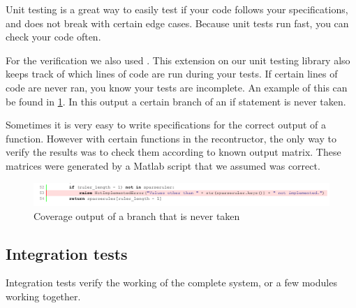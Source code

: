\documentclass[a4paper, openany, oneside]{memoir}
\begin{document}
Unit testing is a great way to easily test if your code follows your specifications, and does not break with certain edge cases. Because unit tests run fast, you can check your code often.

For the verification we also used . This extension on our unit testing library also keeps track of which lines of code are run during your tests. If certain lines of code are never ran, you know your tests are incomplete. An example of this can be found in \cref{fig:coverage_branch}. In this output a certain branch of an if statement is never taken.

Sometimes it is very easy to write specifications for the correct output of a function. However with certain functions in the recontructor, the only way to verify the results was to check them according to known output matrix. These matrices were generated by a Matlab script that we assumed was correct.

\begin{figure}[h]
    \centering
    \includegraphics[width=\textwidth]{fig_branch_coverage.pdf}
    \caption{Coverage output of a branch that is never taken}
    \label{fig:coverage_branch}
\end{figure}

\subsection{Integration tests}
Integration tests verify the working of the complete system, or a few modules working together.
\end{document}

